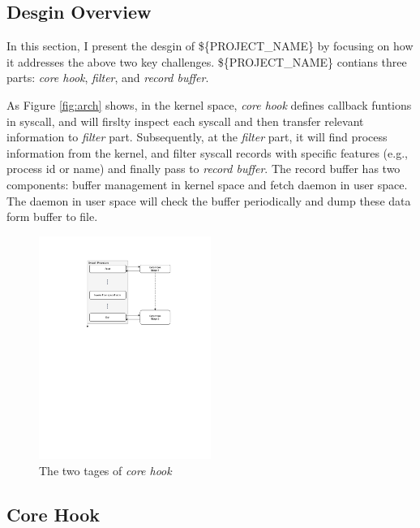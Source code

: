 
\subsection{Desgin Overview}

In this section, I present the desgin of \$\{PROJECT\_NAME\} by focusing on how it addresses the above two key challenges. \$\{PROJECT\_NAME\} contians three parts: \textit{core hook}, \textit{filter}, and \textit{record buffer}. 

As Figure \ref{fig:arch} shows, in the kernel space, \textit{core hook} defines callback funtions in syscall, and will firslty inspect each syscall and then transfer relevant information to \textit{filter} part. Subsequently, at the \textit{filter} part, it will find process information from the kernel, and filter syscall records with specific features (e.g., process id or name) and finally pass to \textit{record buffer}. The record buffer has two components: buffer management in kernel space and fetch daemon in user space. The daemon in user space will check the buffer periodically and dump these data form buffer to file.

\begin{figure}
    \centering
    \includegraphics[width=0.5\textwidth]{figures/core-hook-desgin.pdf}
    \caption{The two tages of \textit{core hook}}
    \label{fig:core-hook-desgin}
\end{figure}


\subsection{Core Hook}


